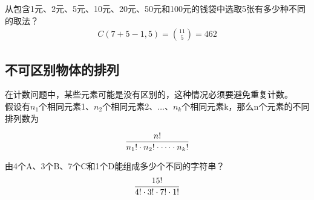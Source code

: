 \begin{tcolorbox}
	从包含1元、2元、5元、10元、20元、50元和100元的钱袋中选取5张有多少种不同的取法？
	\begin{align*}
		C(7+5-1, 5) = {11 \choose 5} = 462
	\end{align*}
\end{tcolorbox}

\vspace{0.5cm}

\subsection{不可区别物体的排列}

在计数问题中，某些元素可能是没有区别的，这种情况必须要避免重复计数。\\

假设有$ n_1 $个相同元素1、$ n_2 $个相同元素2、$ \dots $、$ n_k $个相同元素k，那么n个元素的不同排列数为

\vspace{-1cm}

\begin{align}
	n! \over n_1! \cdot n_2! \cdot \dots \cdot n_k!
\end{align}

\begin{tcolorbox}
	由4个A、3个B、7个C和1个D能组成多少个不同的字符串？
	\begin{align*}
		15! \over 4! \cdot 3! \cdot 7! \cdot 1!
	\end{align*}
\end{tcolorbox}

\newpage